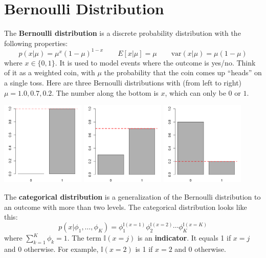 \section{Bernoulli Distribution}

The \textbf{Bernoulli distribution} is a discrete probability distribution with the following properties:
$$ p(x|\mu) = \mu^x (1 - \mu) ^ {1-x} \qquad E[x| \mu] = \mu \qquad \text{var}(x | \mu) = \mu (1 - \mu) $$
where $x \in \{0, 1\}$. It is used to model events where the outcome is yes/no. Think of it as a weighted coin, with $\mu$ the probability that the coin comes up ``heads'' on a single toss. Here are three Bernoulli distributions with (from left to right) $\mu = 1.0, 0.7, 0.2$. The number along the bottom is $x$, which can only be $0$ or $1$. 
\begin{center}
\includegraphics[width=0.3\textwidth]{img/l01-figure2a-bernoulli-1-0.png}
\includegraphics[width=0.3\textwidth]{img/l01-figure2b-bernoulli-0-7.png}
\includegraphics[width=0.3\textwidth]{img/l01-figure2c-bernoulli-0-2.png}
\end{center}

The \textbf{categorical distribution} is a generalization of the Bernoulli distribution to an outcome with more than two levels. The categorical distribution looks like this:
$$ p(x|\phi_1, \dots, \phi_K) = \phi_1^{\mathbb{I}(x=1)} \phi_2^{\mathbb{I}(x=2)} \cdots \phi_K^{\mathbb{I}(x=K)} $$
where $\sum_{k=1}^K \phi_k = 1$. The term $\mathbb{I}(x=j)$ is an \textbf{indicator}. It equals 1 if $x=j$ and 0 otherwise. For example, $\mathbb{I}(x=2)$ is 1 if $x=2$ and 0 otherwise. 

